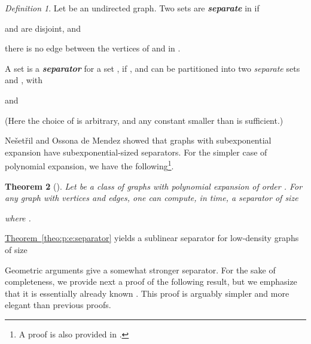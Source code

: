 \documentclass[12pt]{article}
\newcommand{\emphic}[2]{\textcolor{blue25}{\textbf{\emph{#1}}}\index{#2}}
\renewcommand{\emphic}[2]{\textbf{\emph{#1}}}
\newcommand{\emphi}[1]{\emphic{#1}{#1}}
\newtheorem{theorem}{Theorem}\newtheorem{lemma}[theorem]{Lemma}\newtheorem*{restate*}[theorem]{Restatement of }\newtheorem{corollary}[theorem]{Corollary}
\theoremstyle{remark}\theoremheaderfont{\sf}\theorembodyfont{\upshape}
\newtheorem{defn}[theorem]{Definition}
\numberwithin{figure}{section}\numberwithin{table}{section}\numberwithin{equation}{section}
\newcommand{\HLink}[2]{\hyperref[#2]{#1~\ref*{#2}}}
\providecommand{\deflab}[1]{\label{def:#1}}
\newcommand{\thmlab}[1]{{\label{theo:#1}}}
\newcommand{\thmref}[1]{\HLink{Theorem}{theo:#1}}
\newcommand{\Nesetril}{N{e{\v s}et{\v r}il}\xspace}
\newcommand{\si}[1]{#1}
\begin{document}
\begin{defn}\deflab{separator}Let  be an undirected graph.  Two sets
   are \emphi{separate} in 
  if
  \begin{inparaenum}[(i)]
  \item  and  are disjoint, and
  \item there is no edge between the vertices of  and 
    in .
  \end{inparaenum}
  A set  is a \emphi{separator} for a set
  , if
  , and
   can be partitioned into two
  \emph{separate} sets  and , with
  
  and
  
  (Here the choice of  is arbitrary, and any constant smaller
  than  is sufficient.)
\end{defn}

\Nesetril and Ossona \si{de} Mendez showed that graphs with
subexponential expansion have subexponential-sized separators. For the
simpler case of polynomial expansion, we have the following\footnote{A
  proof is also provided in \cite{hq-naape-16-arxiv}.}.

\begin{theorem}[\expandafter{\cite[Theorem 8.3]{no-gcbe2-08}}]\thmlab{p:e:separator}Let  be a class of graphs with polynomial expansion of order
  . For any graph  with  vertices and 
  edges, one can compute, in 
  time, a separator of size
  
  where .\end{theorem}


\thmref{p:e:separator} yields a sublinear separator for low-density
graphs of size

Geometric arguments give a somewhat stronger separator. For the sake
of completeness, we provide next a proof of the following result, but
we emphasize that it is essentially already known
\cite{mttv-sspnng-97,sw-gsta-98,c-ptasp-03}. This proof is arguably
simpler and more elegant than previous proofs.
\end{document}
